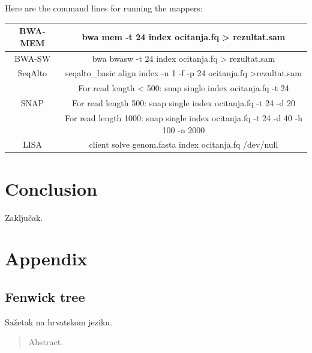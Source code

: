 \documentclass[times, utf8, diplomski]{fer}
\begin{document}
Here are the command lines for running the mappers:
\begin{table}[H]
\centering
\begin{tabular}{|c|c|}
\hline
BWA-MEM & bwa mem -t 24 index ocitanja.fq > rezultat.sam\\
\hline
BWA-SW & bwa bwasw -t 24 index ocitanja.fq > rezultat.sam\\
\hline
SeqAlto & seqalto\_basic align index -n 1 -f -p 24 ocitanja.fq >rezultat.sam\\
\hline
 & For read length < 500: snap single index ocitanja.fq -t 24\\
SNAP & For read length 500: snap single index ocitanja.fq -t 24 -d 20\\
& For read length 1000: snap single index ocitanja.fq -t 24 -d 40 -h 100 -n 2000\\
\hline
LISA & client solve genom.fasta index ocitanja.fq /dev/null\\
\hline
\end{tabular}
\label{komande}
\end{table}


\chapter{Conclusion}
Zaključak.

\chapter{Appendix}
\section{Fenwick tree}




\begin{sazetak}
Sažetak na hrvatskom jeziku.

\end{sazetak}

\begin{abstract}
Abstract.

\end{abstract}
\end{document}
